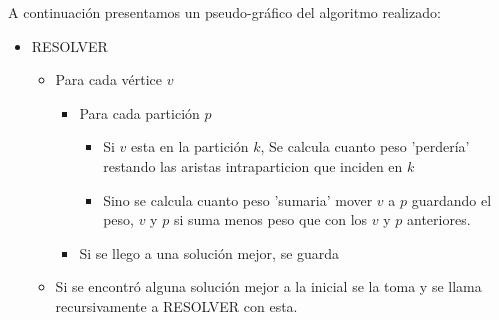 A continuación presentamos un pseudo-gráfico del algoritmo realizado:

\begin{itemize}
\item RESOLVER
	\begin{itemize}
	\item Para cada vértice $v$
		\begin{itemize}
		\item Para cada partición $p$
			\begin{itemize}
			\item Si $v$ esta en la partición $k$, Se calcula cuanto peso 'perdería' restando las aristas intraparticion que inciden en $k$
			\item Sino se calcula cuanto peso 'sumaria' mover $v$ a $p$ guardando el peso, $v$ y $p$ si suma menos peso que con los $v$ y $p$ anteriores.
			\end{itemize}
		\item Si se llego a una solución mejor, se guarda
		\end{itemize}
	\item Si se encontró alguna solución mejor a la inicial se la toma y se llama recursivamente a RESOLVER con esta.
	\end{itemize}
\end{itemize}






